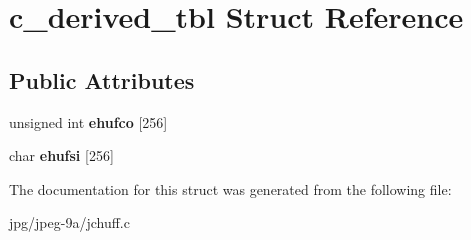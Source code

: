 \hypertarget{structc__derived__tbl}{\section{c\+\_\+derived\+\_\+tbl Struct Reference}
\label{structc__derived__tbl}
}
\subsection*{Public Attributes}
\begin{DoxyCompactItemize}
\item 
\hypertarget{structc__derived__tbl_acb8d0ecc41a6d9e2d1631122368de665}{unsigned int {\bfseries ehufco} \mbox{[}256\mbox{]}}\label{structc__derived__tbl_acb8d0ecc41a6d9e2d1631122368de665}

\item 
\hypertarget{structc__derived__tbl_afbf7d9e461bf60c975e26af7404479ee}{char {\bfseries ehufsi} \mbox{[}256\mbox{]}}\label{structc__derived__tbl_afbf7d9e461bf60c975e26af7404479ee}

\end{DoxyCompactItemize}


The documentation for this struct was generated from the following file\+:\begin{DoxyCompactItemize}
\item 
jpg/jpeg-\/9a/jchuff.\+c\end{DoxyCompactItemize}
